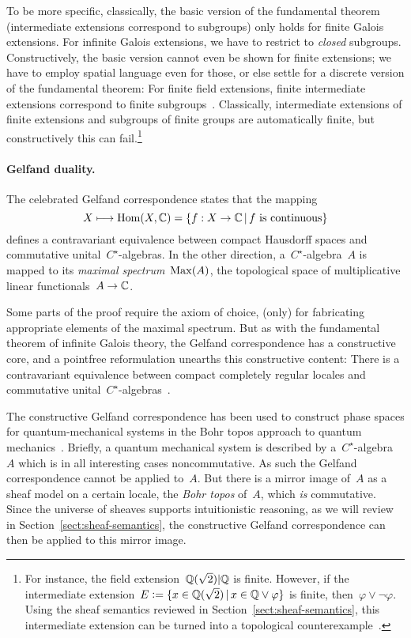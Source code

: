 \documentclass{ws-rv9x6}
\begin{document}
{\begin{remark}
To be more specific, classically, the basic version of the fundamental theorem
(intermediate extensions correspond to subgroups) only holds for finite Galois
extensions. For infinite Galois extensions, we have to restrict to
\emph{closed} subgroups. Constructively, the basic version cannot even be shown
for finite extensions; we have to employ spatial language even for those, or
else settle for a discrete version of the fundamental theorem: For finite field
extensions, finite intermediate extensions correspond to finite
subgroups~\cite[Theorem~8.8]{mines-richman-ruitenburg:constructive-algebra}.
Classically, intermediate extensions of finite extensions and subgroups of
finite groups are automatically finite, but constructively this can
fail.\footnote{For instance, the field extension~$\mathbb{Q}(\sqrt{2})|\mathbb{Q}$ is finite.
However, if the intermediate extension~$E \vcentcolon= \{ x \in \mathbb{Q}(\sqrt{2}) \,|\, x
\in \mathbb{Q} \vee \varphi \}$ is finite, then~$\varphi \vee \neg\varphi$. Using the
sheaf semantics reviewed in Section~\ref{sect:sheaf-semantics}, this
intermediate extension can be turned into a topological
counterexample~\cite[page~65]{wraith:localic-groups}.}
\end{remark}

\paragraph{Gelfand duality.} The celebrated Gelfand correspondence states that
the mapping
\[ X \longmapsto \mathrm{Hom}(X, \mathbb{C}) = \{ f : X \to \mathbb{C} \,|\, \text{$f$ is continuous} \} \]
defines a contravariant equivalence between compact Hausdorff spaces and
commutative unital~$C^\star$-algebras. In the other direction,
a~$C^\star$-algebra~$A$ is mapped to its \emph{maximal spectrum}~$\mathrm{Max}(A)$, the
topological space of multiplicative linear functionals~$A \to \mathbb{C}$.

Some parts of the proof require the axiom of choice, (only) for fabricating
appropriate elements of the maximal spectrum. But as with the fundamental
theorem of infinite Galois theory, the Gelfand correspondence has a
constructive core, and a pointfree reformulation unearths this constructive
content: There is a contravariant equivalence between compact completely
regular locales and commutative
unital~$C^\star$-algebras~\cite{banaschewski-mulvey:gelfand,coquand-spitters:gelfand,henry:gelfand}.

The constructive Gelfand correspondence has been used to construct phase spaces
for quantum-mechanical systems in the Bohr topos approach to quantum
mechanics~\cite{butterfield-hamilton-isham:bohr,heunen-landsman-spitters:bohr,henry:bohr}.
Briefly, a quantum mechanical system is described by a~$C^\star$-algebra~$A$
which is in all interesting cases noncommutative. As such the Gelfand correspondence cannot be
applied to~$A$. But there is a mirror image of~$A$ as a sheaf model on a
certain locale, the \emph{Bohr topos} of~$A$, which \emph{is} commutative.
Since the universe of sheaves supports intuitionistic reasoning, as we will
review in Section~\ref{sect:sheaf-semantics}, the constructive Gelfand
correspondence can then be applied to this mirror image.

}
\end{document}
